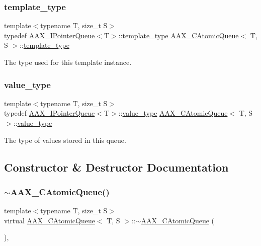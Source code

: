 \subsubsection{\texorpdfstring{template\_type}{template\_type}}
{\footnotesize\ttfamily template$<$typename T, size\+\_\+t S$>$ \\
typedef \mbox{\hyperlink{a01861}{A\+A\+X\+\_\+\+I\+Pointer\+Queue}}$<$T$>$\+::\mbox{\hyperlink{a01441_aae36349d9419de62ce8e74b397749c27}{template\+\_\+type}} \mbox{\hyperlink{a01441}{A\+A\+X\+\_\+\+C\+Atomic\+Queue}}$<$ T, S $>$\+::\mbox{\hyperlink{a01441_aae36349d9419de62ce8e74b397749c27}{template\+\_\+type}}}



The type used for this template instance. 

\mbox{\label{a01441_acbb95bad3be34c7e4c770bc8c455c252}} 
\subsubsection{\texorpdfstring{value\_type}{value\_type}}
{\footnotesize\ttfamily template$<$typename T, size\+\_\+t S$>$ \\
typedef \mbox{\hyperlink{a01861}{A\+A\+X\+\_\+\+I\+Pointer\+Queue}}$<$T$>$\+::\mbox{\hyperlink{a01441_acbb95bad3be34c7e4c770bc8c455c252}{value\+\_\+type}} \mbox{\hyperlink{a01441}{A\+A\+X\+\_\+\+C\+Atomic\+Queue}}$<$ T, S $>$\+::\mbox{\hyperlink{a01441_acbb95bad3be34c7e4c770bc8c455c252}{value\+\_\+type}}}



The type of values stored in this queue. 



\subsection{Constructor \& Destructor Documentation}
\mbox{\label{a01441_a838ca2b3763f10c4e4d9e72b676fd358}} 
\subsubsection{\texorpdfstring{$\sim$AAX\_CAtomicQueue()}{~AAX\_CAtomicQueue()}}
{\footnotesize\ttfamily template$<$typename T, size\+\_\+t S$>$ \\
virtual \mbox{\hyperlink{a01441}{A\+A\+X\+\_\+\+C\+Atomic\+Queue}}$<$ T, S $>$\+::$\sim$\mbox{\hyperlink{a01441}{A\+A\+X\+\_\+\+C\+Atomic\+Queue}} (\begin{DoxyParamCaption}{ }\end{DoxyParamCaption})\hspace{0.3cm}{\ttfamily [inline]}, {\ttfamily [virtual]}}

